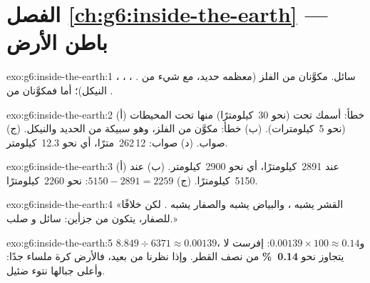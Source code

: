 \section*{الفصل \ref{ch:g6:inside-the-earth} --- باطن الأرض}

\begin{solution}{exo:g6:inside-the-earth:1}
، ، ، . 
سائل.   مكوَّنان من الفلز (معظمه حديد، مع شيء من
النيكل)؛ أما   فمكوَّنان من .
\end{solution}

\begin{solution}{exo:g6:inside-the-earth:2}
(أ) خطأ:  أسمك تحت  (نحو 30~كيلومترًا) منها
تحت المحيطات (نحو 5~كيلومترات). (ب) خطأ:  مكوَّن من الفلز، وهو
سبيكة من الحديد والنيكل. (ج) صواب. (د) صواب: 12\,262~مترًا، أي نحو 12.3~كيلومتر.
\end{solution}

\begin{solution}{exo:g6:inside-the-earth:3}
(أ) عند 2891~كيلومترًا، أي نحو 2900~كيلومتر. (ب) عند 5150~كيلومترًا. (ج) $5150 - 2891 = 2259$:
نحو 2260~كيلومترًا.
\end{solution}

\begin{solution}{exo:g6:inside-the-earth:4}
«القشر يشبه \underline{}، والبياض يشبه
\underline{} والصفار يشبه \underline{}. لكن خلافًا
للصفار، يتكون \underline{} من جزأين: \underline{}
سائل و\underline{} صلب.»
\end{solution}

\begin{solution}{exo:g6:inside-the-earth:5}
$8.849 \div 6371 \approx 0.00139$، و$0.00139 \times 100 \approx 0.14$:
 إفرست لا يتجاوز نحو \textbf{0.14~\%} من نصف القطر. وإذا نظرنا من بعيد،
فالأرض كرة ملساء جدًا: وأعلى جبالها نتوء ضئيل.
\end{solution}

